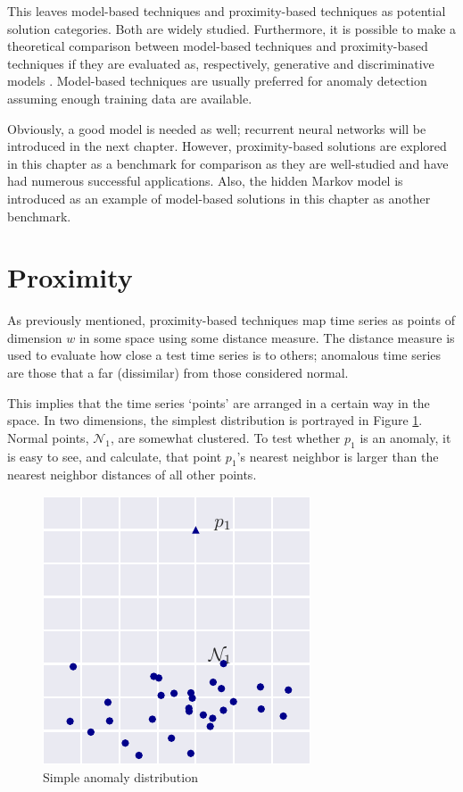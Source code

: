 This leaves model-based techniques and proximity-based techniques as potential solution categories. Both are widely studied. Furthermore, it is possible to make a theoretical comparison between model-based techniques and proximity-based techniques if they are evaluated as, respectively, generative and discriminative models \cite{Ng2006}. Model-based techniques are usually preferred for anomaly detection \cite{Ngkvist2014} assuming enough training data are available.

Obviously, a good model is needed as well; recurrent neural networks will be introduced in the next chapter. However, proximity-based solutions are explored in this chapter as a benchmark for comparison as they are well-studied and have had numerous successful applications. Also, the hidden Markov model is introduced as an example of model-based solutions in this chapter as another benchmark.


\section{Proximity}
\label{sec:adproximity}

As previously mentioned, proximity-based techniques map time series as points of dimension $w$ in some space using some distance measure. The distance measure is used to evaluate how close a test time series is to others; anomalous time series are those that a far (dissimilar) from those considered normal.

This implies that the time series `points' are arranged in a certain way in the space. In two dimensions, the simplest distribution is portrayed in Figure \ref{fig:simple_dist}. Normal points, $\mathcal{N}_1$, are somewhat clustered. To test whether $p_1$ is an anomaly, it is easy to see, and calculate, that point $p_1$'s nearest neighbor is larger than the nearest neighbor distances of all other points.

\begin{figure}[H]
  \centering
  \includegraphics{figs/simple_dist.pdf}
  \caption{Simple anomaly distribution}
  \label{fig:simple_dist}
\end{figure}

